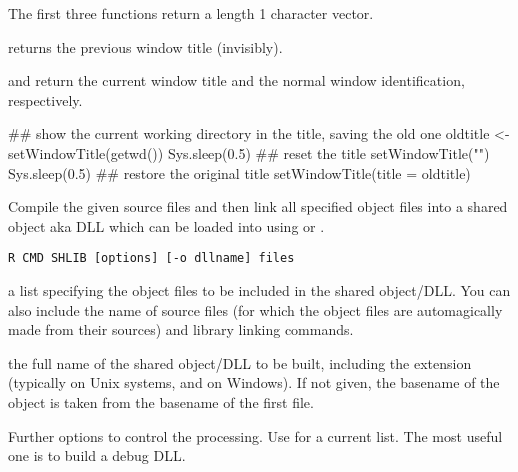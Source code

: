 %
\begin{Value}
The first three functions return a length 1 character vector.

 returns the previous window title (invisibly).  

 and  return the current
window title and the normal window identification, respectively.
\end{Value}
%
\begin{Examples}
\begin{ExampleCode}
## show the current working directory in the title, saving the old one
oldtitle <- setWindowTitle(getwd())
Sys.sleep(0.5)
## reset the title
setWindowTitle("")
Sys.sleep(0.5)
## restore the original title
setWindowTitle(title = oldtitle)
\end{ExampleCode}
\end{Examples}
%
\begin{Description}\relax
Compile the given source files and then link all specified object
files into a shared object aka DLL which can be loaded into \R{} using
 or .
\end{Description}
%
\begin{Usage}
\begin{verbatim}
R CMD SHLIB [options] [-o dllname] files
\end{verbatim}
\end{Usage}
%
\begin{Arguments}
\begin{ldescription}
\item[\code{files}] a list specifying the object files to be included in the
shared object/DLL.  You can also include the name of source files (for
which the object files are automagically made from their sources)
and library linking commands.

\item[\code{dllname}] the full name of the shared object/DLL to be built,
including the extension (typically  on Unix systems, and
 on Windows).  If not given, the basename of the object
is taken from the basename of the first file.
\item[\code{options}] Further options to control the processing.  Use
 for a current list.
The most useful one is  to build a debug DLL.

\end{ldescription}
\end{Arguments}
